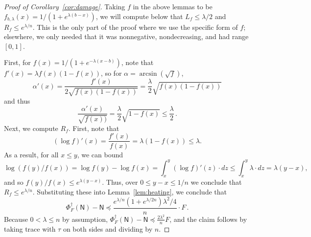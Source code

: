 \documentclass[10pt]{article}
\newcommand{\luders}{\Phi}
\begin{document}
\begin{proof}[Proof of Corollary~\ref{cor:damage}]
    Taking $f$ in the above lemmas to be $f_{b, \lambda}(x) = 1/(1 + e^{\lambda(b - x)})$, we will compute below that $L_f \le \lambda/2$ and $R_f \le e^{\lambda/n}$. This is the only part of the proof where we use the specific form of $f$; elsewhere, we only needed that it was nonnegative, nondecreasing, and had range $[0,1]$.
    
    First, for $f(x) = 1/(1 + e^{-\lambda(x - b)})$, note that $f'(x) = \lambda f(x)(1 - f(x))$, so for $\alpha = \arcsin(\sqrt{f})$,
    \begin{equation}
        \alpha'(x) = \frac{f'(x)}{2\sqrt{f(x)(1 - f(x))}} = \frac{\lambda}{2}\sqrt{f(x)(1 - f(x))}
    \end{equation}
    and thus 
    \begin{equation}
        \frac{\alpha'(x)}{\sqrt{f(x))}} = \frac{\lambda}{2}\sqrt{1 - f(x)}\le \frac{\lambda}{2}\,.
    \end{equation}
    Next, we compute $R_f$.
    First, note that
    \begin{equation*}
        (\log f)'(x)
        = \frac{f'(x)}{f(x)} = \lambda (1 - f(x)) \leq \lambda.
    \end{equation*}
    As a result, for all $x \leq y$, we can bound
    \begin{equation*}
        \log(f(y)/f(x))
        = \log f(y) - \log f(x)
        = \int_{x}^y (\log f)'(z) \cdot dz
        \leq \int_{x}^y \lambda \cdot  dz
        = \lambda (y-x),
    \end{equation*}
    and so $f(y)/f(x) \leq e^{\lambda(y-x)}$.
    Thus, over $0 \le y - x\le 1/n$ we conclude that $R_f \le e^{\lambda/n}$.
    Substituting these into Lemma~\ref{lem:heating}, we conclude that
    \begin{equation}
        \luders^\dagger_F(\mathsf{N}) - \mathsf{N} \preceq \frac{e^{\lambda/n}(1 + e^{\lambda/2n})\lambda^2/4}{n}\cdot F\,.
    \end{equation}
    Because $0 < \lambda \le n$ by assumption, $\luders^\dagger_F(\mathsf{N}) - \mathsf{N} \preceq \frac{2\lambda^2}{n} F$, and the claim follows by taking trace with $\tau$ on both sides and dividing by $n$.
\end{proof}

\end{document}
